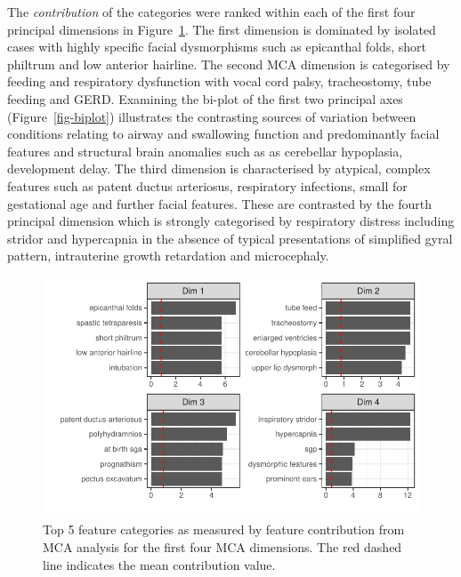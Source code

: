 \documentclass[
  letterpaper,
  DIV=11,
  numbers=noendperiod]{scrartcl}
\begin{document}
The \emph{contribution} of the categories were ranked within each of the
first four principal dimensions in Figure~\ref{fig-ctr}. The first
dimension is dominated by isolated cases with highly specific facial
dysmorphisms such as epicanthal folds, short philtrum and low anterior
hairline. The second MCA dimension is categorised by feeding and
respiratory dysfunction with vocal cord palsy, tracheostomy, tube
feeding and GERD. Examining the bi-plot of the first two principal axes
(Figure~\ref{fig-biplot}) illustrates the contrasting sources of
variation between conditions relating to airway and swallowing function
and predominantly facial features and structural brain anomalies such as
as cerebellar hypoplasia, development delay. The third dimension is
characterised by atypical, complex features such as patent ductus
arteriosus, respiratory infections, small for gestational age and
further facial features. These are contrasted by the fourth principal
dimension which is strongly categorised by respiratory distress
including stridor and hypercapnia in the absence of typical
presentations of simplified gyral pattern, intrauterine growth
retardation and microcephaly.

\begin{figure}

{\centering \includegraphics{paper_files/figure-pdf/fig-ctr-1.pdf}

}

\caption{\label{fig-ctr}Top 5 feature categories as measured by feature
contribution from MCA analysis for the first four MCA dimensions. The
red dashed line indicates the mean contribution value.}

\end{figure}
\end{document}
